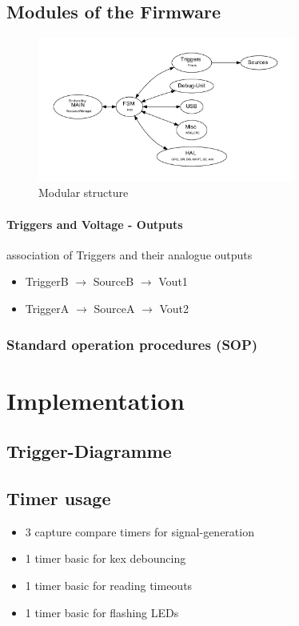 \documentclass[master,english,smartquotes,apa]{hgbthesis}
\begin{document}
		\section{Modules of the Firmware}
		\begin{figure}[H]
			\center
			\includegraphics[width=0.75\textwidth]{src/_FW-Modules.pdf}
			\caption{Modular structure}
			\label{fig:_FW-Modules}
		\end{figure}
	

		\subsubsection{Triggers and Voltage - Outputs}
		association of Triggers and their analogue outputs
		\begin{itemize}
			\item TriggerB $\rightarrow$ SourceB $\rightarrow$ Vout1
			\item TriggerA $\rightarrow$ SourceA $\rightarrow$ Vout2
		\end{itemize}
		\subsection{Standard operation procedures (SOP)}
		{	\scriptsize
			
		}

	\chapter{Implementation}
	\label{cha:Implementation}
		\section{Trigger-Diagramme}
		\section{Timer usage}
			\begin{itemize} \setlength\itemsep{1px}
			\item 3 capture compare timers for signal-generation
			\item 1 timer basic for kex debouncing 
			\item 1 timer basic for reading timeouts
			\item 1 timer basic for flashing LEDs
			\end{itemize}
\end{document}
